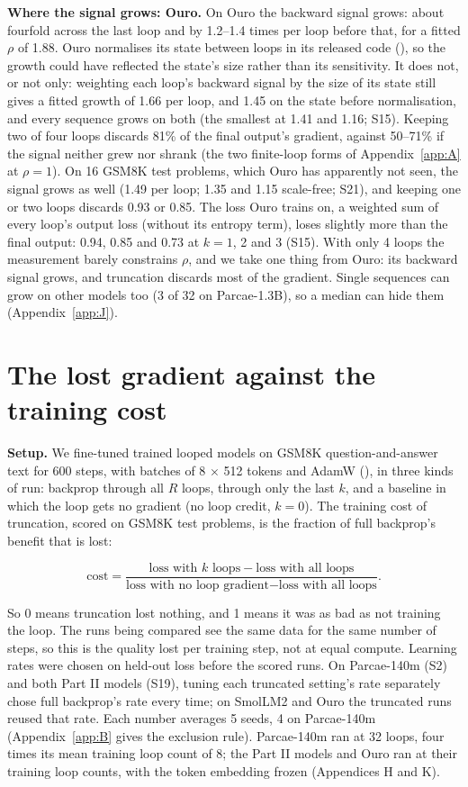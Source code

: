 \documentclass[10pt]{article}
\begin{document}
\textbf{Where the signal grows: Ouro.} On Ouro the backward signal grows: about fourfold across the last loop and by 1.2--1.4 times per loop before that, for a fitted $\rho$ of 1.88. Ouro normalises its state between loops in its released code (\citealp[App.~D.1]{guo2026}), so the growth could have reflected the state's size rather than its sensitivity. It does not, or not only: weighting each loop's backward signal by the size of its state still gives a fitted growth of 1.66 per loop, and 1.45 on the state before normalisation, and every sequence grows on both (the smallest at 1.41 and 1.16; S15). Keeping two of four loops discards 81\% of the final output's gradient, against 50--71\% if the signal neither grew nor shrank (the two finite-loop forms of Appendix~\ref{app:A} at $\rho = 1$). On 16 GSM8K test problems, which Ouro has apparently not seen, the signal grows as well (1.49 per loop; 1.35 and 1.15 scale-free; S21), and keeping one or two loops discards 0.93 or 0.85. The loss Ouro trains on, a weighted sum of every loop's output loss (without its entropy term), loses slightly more than the final output: 0.94, 0.85 and 0.73 at $k = 1$, 2 and 3 (S15). With only 4 loops the measurement barely constrains $\rho$, and we take one thing from Ouro: its backward signal grows, and truncation discards most of the gradient. Single sequences can grow on other models too (3 of 32 on Parcae-1.3B), so a median can hide them (Appendix~\ref{app:J}).

\section{The lost gradient against the training cost}\label{sec:4}

\textbf{Setup.} We fine-tuned trained looped models on GSM8K question-and-answer text for 600 steps, with batches of 8 $\times$ 512 tokens and AdamW (\citealp{loshchilov2019}), in three kinds of run: backprop through all $R$ loops, through only the last $k$, and a baseline in which the loop gets no gradient (no loop credit, $k = 0$). The training cost of truncation, scored on GSM8K test problems, is the fraction of full backprop's benefit that is lost:

\begin{equation*}\text{cost}=\frac{\text{loss with $k$ loops}-\text{loss with all loops}}{\text{loss with no loop gradient}-\text{loss with all loops}}.\end{equation*}

So 0 means truncation lost nothing, and 1 means it was as bad as not training the loop. The runs being compared see the same data for the same number of steps, so this is the quality lost per training step, not at equal compute. Learning rates were chosen on held-out loss before the scored runs. On Parcae-140m (S2) and both Part II models (S19), tuning each truncated setting's rate separately chose full backprop's rate every time; on SmolLM2 and Ouro the truncated runs reused that rate. Each number averages 5 seeds, 4 on Parcae-140m (Appendix~\ref{app:B} gives the exclusion rule). Parcae-140m ran at 32 loops, four times its mean training loop count of 8; the Part II models and Ouro ran at their training loop counts, with the token embedding frozen (Appendices H and K).
\end{document}

